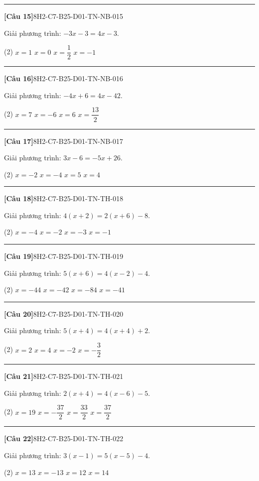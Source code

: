 \documentclass[12pt,a4paper]{article}
\newif\ifloigiai
\newenvironment{cauhoi}[2]{%
  \par\medskip\noindent\rule{\textwidth}{0.4pt}\par\nopagebreak
  \noindent\textbf{[#1]}\hfill{\scriptsize\ttfamily #2}\par\nopagebreak\smallskip}{\par}
\newcommand{\dapan}[1]{\ifloigiai\par\smallskip\noindent\textit{Đáp án:} \textbf{#1}\par\fi}
\begin{document}
\begin{cauhoi}{Câu 15}{8H2-C7-B25-D01-TN-NB-015}
Giải phương trình: $-3x - 3=4x - 3$.
\begin{tasks}(2)
\task $x=1$
\task $x=0$
\task $x=\dfrac{1}{2}$
\task $x=-1$
\end{tasks}
\dapan{B}
\end{cauhoi}
\begin{cauhoi}{Câu 16}{8H2-C7-B25-D01-TN-NB-016}
Giải phương trình: $-4x + 6=4x - 42$.
\begin{tasks}(2)
\task $x=7$
\task $x=-6$
\task $x=6$
\task $x=\dfrac{13}{2}$
\end{tasks}
\dapan{C}
\end{cauhoi}
\begin{cauhoi}{Câu 17}{8H2-C7-B25-D01-TN-NB-017}
Giải phương trình: $3x - 6=-5x + 26$.
\begin{tasks}(2)
\task $x=-2$
\task $x=-4$
\task $x=5$
\task $x=4$
\end{tasks}
\dapan{D}
\end{cauhoi}
\begin{cauhoi}{Câu 18}{8H2-C7-B25-D01-TN-TH-018}
Giải phương trình: $4(x + 2)=2(x + 6)-8$.
\begin{tasks}(2)
\task $x=-4$
\task $x=-2$
\task $x=-3$
\task $x=-1$
\end{tasks}
\dapan{B}
\end{cauhoi}
\begin{cauhoi}{Câu 19}{8H2-C7-B25-D01-TN-TH-019}
Giải phương trình: $5(x + 6)=4(x - 2)-4$.
\begin{tasks}(2)
\task $x=-44$
\task $x=-42$
\task $x=-84$
\task $x=-41$
\end{tasks}
\dapan{B}
\end{cauhoi}
\begin{cauhoi}{Câu 20}{8H2-C7-B25-D01-TN-TH-020}
Giải phương trình: $5(x + 4)=4(x + 4)+2$.
\begin{tasks}(2)
\task $x=2$
\task $x=4$
\task $x=-2$
\task $x=-\dfrac{3}{2}$
\end{tasks}
\dapan{C}
\end{cauhoi}
\begin{cauhoi}{Câu 21}{8H2-C7-B25-D01-TN-TH-021}
Giải phương trình: $2(x + 4)=4(x - 6)-5$.
\begin{tasks}(2)
\task $x=19$
\task $x=-\dfrac{37}{2}$
\task $x=\dfrac{33}{2}$
\task $x=\dfrac{37}{2}$
\end{tasks}
\dapan{D}
\end{cauhoi}
\begin{cauhoi}{Câu 22}{8H2-C7-B25-D01-TN-TH-022}
Giải phương trình: $3(x - 1)=5(x - 5)-4$.
\begin{tasks}(2)
\task $x=13$
\task $x=-13$
\task $x=12$
\task $x=14$
\end{tasks}
\dapan{A}
\end{cauhoi}
\end{document}
